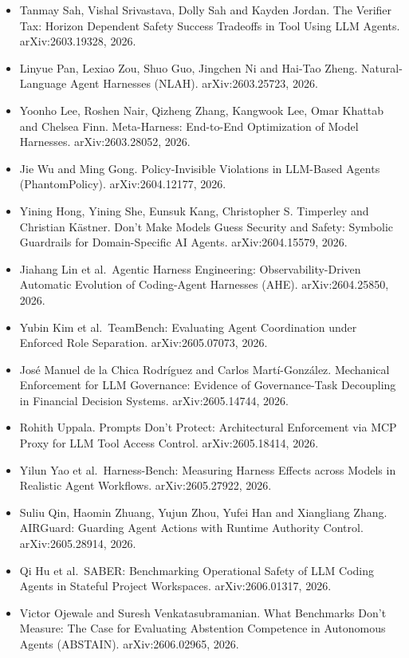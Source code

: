 \documentclass[11pt]{article}
\begin{document}
\begin{itemize}
\item
  Tanmay Sah, Vishal Srivastava, Dolly Sah and Kayden Jordan. The Verifier Tax: Horizon Dependent Safety Success Tradeoffs in Tool Using LLM Agents. arXiv:2603.19328, 2026.
\item
  Linyue Pan, Lexiao Zou, Shuo Guo, Jingchen Ni and Hai-Tao Zheng. Natural-Language Agent Harnesses (NLAH). arXiv:2603.25723, 2026.
\item
  Yoonho Lee, Roshen Nair, Qizheng Zhang, Kangwook Lee, Omar Khattab and Chelsea Finn. Meta-Harness: End-to-End Optimization of Model Harnesses. arXiv:2603.28052, 2026.
\item
  Jie Wu and Ming Gong. Policy-Invisible Violations in LLM-Based Agents (PhantomPolicy). arXiv:2604.12177, 2026.
\item
  Yining Hong, Yining She, Eunsuk Kang, Christopher S. Timperley and Christian K\"astner. Don't Make Models Guess Security and Safety: Symbolic Guardrails for Domain-Specific AI Agents. arXiv:2604.15579, 2026.
\item
  Jiahang Lin et al.~Agentic Harness Engineering: Observability-Driven Automatic Evolution of Coding-Agent Harnesses (AHE). arXiv:2604.25850, 2026.
\item
  Yubin Kim et al.~TeamBench: Evaluating Agent Coordination under Enforced Role Separation. arXiv:2605.07073, 2026.
\item
  Jos\'e Manuel de la Chica Rodr\'iguez and Carlos Mart\'i-Gonz\'alez. Mechanical Enforcement for LLM Governance: Evidence of Governance-Task Decoupling in Financial Decision Systems. arXiv:2605.14744, 2026.
\item
  Rohith Uppala. Prompts Don't Protect: Architectural Enforcement via MCP Proxy for LLM Tool Access Control. arXiv:2605.18414, 2026.
\item
  Yilun Yao et al.~Harness-Bench: Measuring Harness Effects across Models in Realistic Agent Workflows. arXiv:2605.27922, 2026.
\item
  Suliu Qin, Haomin Zhuang, Yujun Zhou, Yufei Han and Xiangliang Zhang. AIRGuard: Guarding Agent Actions with Runtime Authority Control. arXiv:2605.28914, 2026.
\item
  Qi Hu et al.~SABER: Benchmarking Operational Safety of LLM Coding Agents in Stateful Project Workspaces. arXiv:2606.01317, 2026.
\item
  Victor Ojewale and Suresh Venkatasubramanian. What Benchmarks Don't Measure: The Case for Evaluating Abstention Competence in Autonomous Agents (ABSTAIN). arXiv:2606.02965, 2026.

\end{itemize}
\end{document}
